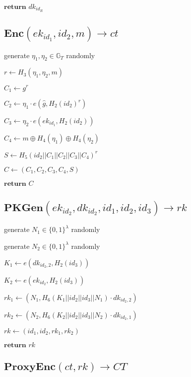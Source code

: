 \documentclass[a4paper]{article}
\begin{document}
$\textbf{return }\textit{dk}_{\textit{id}_R}$

\subsection{$\textbf{Enc}(\textit{ek}_{\textit{id}_1}, \textit{id}_2, m) \rightarrow \textit{ct}$}

generate $\eta_1, \eta_2 \in \mathbb{G}_T$ randomly

$r \gets H_3(\eta_1, \eta_2, m)$

$C_1 \gets g^r$

$C_2 \gets \eta_1 \cdot e(\hat{g}, H_2(\textit{id}_2)^r)$

$C_3 \gets \eta_2 \cdot e(\textit{ek}_{\textit{id}_1}, H_2(\textit{id}_2))$

$C_4 \gets m \oplus H_4(\eta_1) \oplus H_4(\eta_2)$

$S \gets H_5(\textit{id}_2 || C_1 || C_2 || C_3 || C_4)^r$

$C \gets (C_1, C_2, C_3, C_4, S)$

$\textbf{return }C$

\subsection{$\textbf{PKGen}(\textit{ek}_{\textit{id}_2}, \textit{dk}_{\textit{id}_2}, \textit{id}_1, \textit{id}_2, \textit{id}_3) \rightarrow \textit{rk}$}

generate $N_1 \in \{0, 1\}^\lambda$ randomly

generate $N_2 \in \{0, 1\}^\lambda$ randomly

$K_1 \gets e(\textit{dk}_{\textit{id}_2, 2}, H_2(\textit{id}_3))$

$K_2 \gets e(\textit{ek}_{\textit{id}_2}, H_2(\textit{id}_3))$

$\textit{rk}_1 \gets (N_1, H_6(K_1 || \textit{id}_2 || \textit{id}_3 || N_1) \cdot \textit{dk}_{\textit{id}_2, 2})$

$\textit{rk}_2 \gets (N_2, H_6(K_2 || \textit{id}_2 || \textit{id}_3 || N_2) \cdot \textit{dk}_{\textit{id}_2, 1})$

$\textit{rk} \gets (\textit{id}_1, \textit{id}_2, \textit{rk}_1, \textit{rk}_2)$

$\textbf{return }\textit{rk}$

\subsection{$\textbf{ProxyEnc}(\textit{ct}, \textit{rk}) \rightarrow \textit{CT}$}
\end{document}
